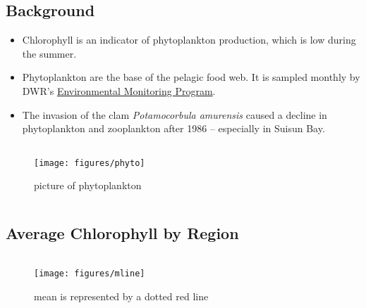 \documentclass[
]{book}
\providecommand{\tightlist}{%
  \setlength{\itemsep}{0pt}\setlength{\parskip}{0pt}}
\begin{document}
\begin{columns-nocenter}

\begin{column}

\hypertarget{background-2}{%
\subsection{Background}\label{background-2}}

\begin{itemize}
\tightlist
\item
  Chlorophyll is an indicator of phytoplankton production, which is low during the summer.
\item
  Phytoplankton are the base of the pelagic food web. It is sampled monthly by DWR's \href{https://emp.baydeltalive.com/wiki/12297}{Environmental Monitoring Program}.
\item
  The invasion of the clam \emph{Potamocorbula amurensis} caused a decline in phytoplankton and zooplankton after 1986 -- especially in Suisun Bay.
\end{itemize}

\end{column}

\begin{column}

\begin{figure}

{\centering \texttt{[image: figures/phyto]} 

}

\caption{picture of phytoplankton}\label{fig:unnamed-chunk-61}
\end{figure}

\end{column}

\end{columns-nocenter}

\hypertarget{average-chlorophyll-by-region}{%
\subsection{Average Chlorophyll by Region}\label{average-chlorophyll-by-region}}

\begin{columns-nocenter}

\begin{column}

\begin{figure}
\texttt{[image: figures/mline]} \caption{mean is represented by a dotted red line}\label{fig:unnamed-chunk-62}
\end{figure}

\end{column}

\begin{column}

\end{column}

\begin{column}

\end{column}

\end{columns-nocenter}
\end{document}
